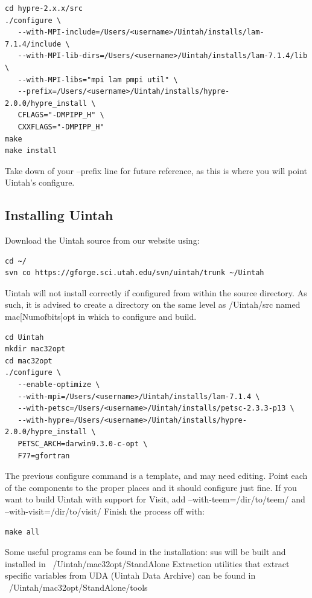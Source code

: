 \documentclass[12pt]{article}
\begin{document}
\begin{verbatim}
cd hypre-2.x.x/src
./configure \
   --with-MPI-include=/Users/<username>/Uintah/installs/lam-7.1.4/include \
   --with-MPI-lib-dirs=/Users/<username>/Uintah/installs/lam-7.1.4/lib \
   --with-MPI-libs="mpi lam pmpi util" \
   --prefix=/Users/<username>/Uintah/installs/hypre-2.0.0/hypre_install \
   CFLAGS="-DMPIPP_H" \
   CXXFLAGS="-DMPIPP_H" 
make
make install
\end{verbatim}

Take down of your --prefix line for future reference, as this is where you will point Uintah's configure.

\subsection{Installing Uintah}
Download the Uintah source from our website using:

\begin{verbatim}
cd ~/
svn co https://gforge.sci.utah.edu/svn/uintah/trunk ~/Uintah
\end{verbatim}

Uintah will not install correctly if configured from within the source directory.  As such, it is advised to create a directory on the same level as /Uintah/src named mac[Numofbits]opt in which to configure and build.  

\begin{verbatim}
cd Uintah
mkdir mac32opt
cd mac32opt
./configure \
   --enable-optimize \
   --with-mpi=/Users/<username>/Uintah/installs/lam-7.1.4 \
   --with-petsc=/Users/<username>/Uintah/installs/petsc-2.3.3-p13 \
   --with-hypre=/Users/<username>/Uintah/installs/hypre-2.0.0/hypre_install \
   PETSC_ARCH=darwin9.3.0-c-opt \
   F77=gfortran
\end{verbatim}

The previous configure command is a template, and may need editing.  Point each of the components to the proper places and it should configure just fine.  If you want to build Uintah with support for Visit, add --with-teem=/dir/to/teem/ and --with-visit=/dir/to/visit/ Finish the process off with:

\begin{verbatim}
make all
\end{verbatim}
  

Some useful programs can be found in the installation:  
sus will be built and installed in ~/Uintah/mac32opt/StandAlone  
Extraction utilities that extract specific variables from UDA (Uintah Data Archive) can be found in ~/Uintah/mac32opt/StandAlone/tools
\end{document}
